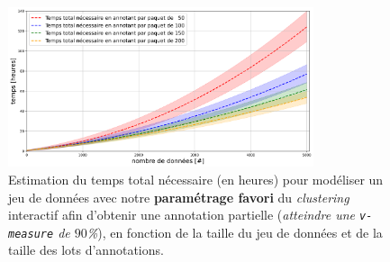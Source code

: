 		\begin{figure}[!htb]
			\centering
			\includegraphics[width=0.8\textwidth]{figures/etude-temps-total-1-modelisation}
			\caption{Estimation du temps total nécessaire (en heures) pour modéliser un jeu de données avec notre \textbf{paramétrage favori} du \textit{clustering} interactif afin d'obtenir une annotation partielle (\textit{atteindre une \texttt{v-measure} de $90$\%}), en fonction de la taille du jeu de données et de la taille des lots d'annotations.}
			\label{figure:4.3.4-ETUDE-COUT-TOTAL}
		\end{figure}
	
		
		
		
		
		
